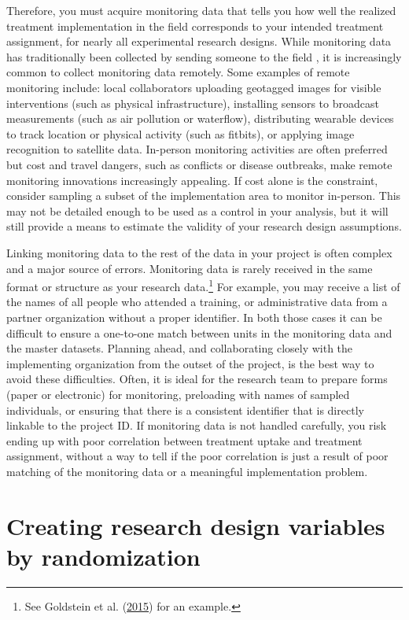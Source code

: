 \documentclass[
]{book}
\begin{document}
Therefore, you must acquire monitoring data that
tells you how well the realized treatment implementation in the field
corresponds to your intended treatment assignment,
for nearly all experimental research designs.
While monitoring data has traditionally been collected by sending someone to the field ,
it is increasingly common to collect monitoring data remotely.
Some examples of remote monitoring include:
local collaborators uploading geotagged images for visible interventions (such as physical infrastructure),
installing sensors to broadcast measurements (such as air pollution or waterflow),
distributing wearable devices to track location or physical activity (such as fitbits),
or applying image recognition to satellite data.
In-person monitoring activities are often preferred but
cost and travel dangers, such as conflicts or disease outbreaks,
make remote monitoring innovations increasingly appealing.
If cost alone is the constraint,
consider sampling a subset of the implementation area to monitor in-person.
This may not be detailed enough to be used as a control in your analysis,
but it will still provide a means to
estimate the validity of your research design assumptions.

Linking monitoring data to the rest of the data in your project
is often complex and a major source of errors.
Monitoring data is rarely received in the same format or structure as your research data.\footnote{See Goldstein et al. (\protect\hyperlink{ref-goldstein2015formalizing}{2015}) for an example.}
For example, you may receive a list of the names of all people who attended a training,
or administrative data from a partner organization without a proper identifier.
In both those cases it can be difficult to ensure a one-to-one match
between units in the monitoring data and the master datasets.
Planning ahead, and collaborating closely with the implementing
organization from the outset of the project,
is the best way to avoid these difficulties.
Often, it is ideal for the research team to prepare forms (paper or electronic) for monitoring,
preloading with names of sampled individuals,
or ensuring that there is a consistent identifier that is directly linkable to the project ID.
If monitoring data is not handled carefully, you risk ending up with poor correlation
between treatment uptake and treatment assignment,
without a way to tell if the poor correlation is just
a result of poor matching of the monitoring data or a meaningful implementation problem.

\hypertarget{creating-research-design-variables-by-randomization}{%
\section*{Creating research design variables by randomization}\label{creating-research-design-variables-by-randomization}}
\end{document}
